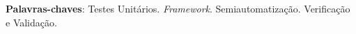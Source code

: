 \begin{resumo}


\vspace{\onelineskip}

\noindent
\textbf{Palavras-chaves}: Testes Unitários. \textit{Framework}.
Semiautomatização. Verificação e Validação.
\end{resumo}
